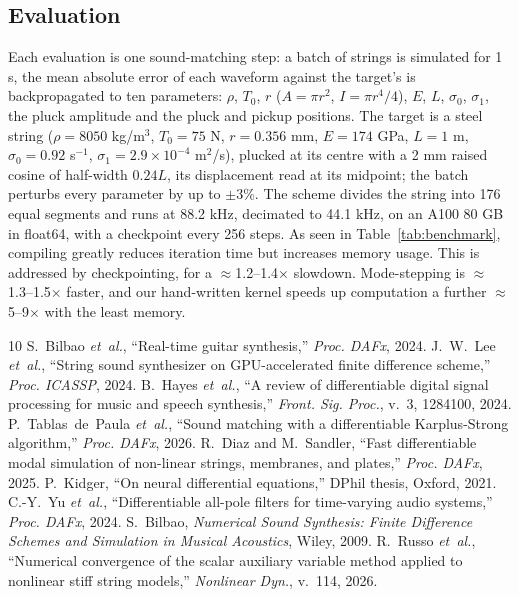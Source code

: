 \documentclass[a4paper]{article}
\newcommand{\step}{\rotatebox[origin=c]{180}{$\Lsh$}}
\begin{document}
\begin{sloppy}
\section{Evaluation}
Each evaluation is one sound-matching step: a batch of strings is simulated
for 1 s, the mean absolute error of each waveform against the target's is backpropagated to ten parameters:
$\rho$, $T_0$, $r$ ($A=\pi r^2$, $I=\pi r^4/4$), $E$, $L$, $\sigma_0$,
$\sigma_1$, the pluck amplitude and the pluck and pickup positions. The target
is a steel string ($\rho=8050$ kg/m$^3$, $T_0=75$ N, $r=0.356$ mm, $E=174$ GPa,
$L=1$ m, $\sigma_0=0.92$ s$^{-1}$, $\sigma_1=2.9\times10^{-4}$ m$^2$/s), plucked
at its centre with a 2 mm raised cosine of half-width $0.24L$, its
displacement read at its midpoint; the batch perturbs every parameter by up to
$\pm3\%$. The scheme divides the string into 176 equal segments and runs
at 88.2 kHz, decimated to 44.1 kHz, on an A100 80 GB in float64, with a
checkpoint every 256 steps. As seen in Table~\ref{tab:benchmark}, compiling
greatly reduces iteration time but increases memory usage. This is
addressed by checkpointing, for a $\approx$1.2--1.4$\times$ slowdown.
Mode-stepping is $\approx$1.3--1.5$\times$ faster, and our hand-written
kernel speeds up computation a further $\approx$5--9$\times$ with the least
memory.

\begin{table}[t]
 \centering
 \setlength{\tabcolsep}{3.5pt}
 \renewcommand{\arraystretch}{0.86}
 \resizebox{\columnwidth}{!}{}
 \caption{Peak memory and time of one gradient step. \step: adds one ingredient to the row above; \textemdash: exceeds the A100\textquotesingle s 80\,GB.}
 \label{tab:benchmark}
\end{table}

{\footnotesize
\begin{thebibliography}{10}
 S.~Bilbao \emph{et~al.}, ``Real-time guitar synthesis,'' \emph{Proc. DAFx}, 2024.
 J.~W.~Lee \emph{et~al.}, ``String sound synthesizer on GPU-accelerated finite difference scheme,'' \emph{Proc. ICASSP}, 2024.
 B.~Hayes \emph{et~al.}, ``A review of differentiable digital signal processing for music and speech synthesis,'' \emph{Front. Sig. Proc.}, v.~3, 1284100, 2024.
 P.~Tablas~de~Paula \emph{et~al.}, ``Sound matching with a differentiable Karplus-Strong algorithm,'' \emph{Proc. DAFx}, 2026.
 R.~Diaz and M.~Sandler, ``Fast differentiable modal simulation of non-linear strings, membranes, and plates,'' \emph{Proc. DAFx}, 2025.
 P.~Kidger, ``On neural differential equations,'' DPhil thesis, Oxford, 2021.
 C.-Y.~Yu \emph{et~al.}, ``Differentiable all-pole filters for time-varying audio systems,'' \emph{Proc. DAFx}, 2024.
 S.~Bilbao, \emph{Numerical Sound Synthesis: Finite Difference Schemes and Simulation in Musical Acoustics}, Wiley, 2009.
 R.~Russo \emph{et~al.}, ``Numerical convergence of the scalar auxiliary variable method applied to nonlinear stiff string models,'' \emph{Nonlinear Dyn.}, v.~114, 2026.
\end{thebibliography}}
\end{sloppy}
\end{document}
